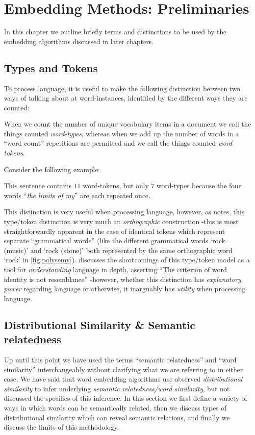 \chapter{Embedding Methods: Preliminaries}
In this chapter we outline briefly terms and distinctions to be used by the embedding algorithms discussed in later chapters.

\section{Types and Tokens}
To process language, it is useful to make the following distinction between two ways of talking about at word-instances, identified by the different ways they are counted:
\begin{definition}
  When we count the number of unique vocabulary items in a document we call the things counted \emph{word-types}, whereas when we add up the number of words in a ``word count'' repetitions are permitted and we call the things counted \emph{word tokens}.
\end{definition}
Consider the following example:
\begin{example}\par
\phantom{line}
This sentence contains $11$ word-tokens, but only $7$ word-types because the four words ``\emph{the limits of my}'' are each repeated once.
\end{example}
This distinction is very useful when processing language, however, as \textcite{kaplan-1990-words} notes, this type/token distinction is very much an \emph{orthographic} construction -this is most straightforwardly apparent in the case of identical tokens which represent separate ``grammatical words'' (like the different grammatical words `rock (music)' and `rock (stone)' both represented by the same orthographic word `rock' in \autoref{fig:polysemy}). \citeauthor{kaplan-1990-words} discusses the shortcomings of this type/token model as a tool for \emph{understanding} language in depth, asserting ``The criterion of word identity is not resemblance'' -however, whether this distinction has \emph{explanatory power} regarding language or otherwise, it inarguably has \emph{utility} when processing language.

\section{Distributional Similarity \& Semantic relatedness}\label{sec:semantic-relatedness}
Up until this point we have used the terms ``semantic relatedness'' and ``word similarity'' interchangeably without clarifying what we are referring to in either case. We have said that word embedding algorithms use observed \emph{distributional similarity} to infer underlying \emph{semantic relatedness/word similarity}, but not discussed the specifics of this inference. In this section we first define a variety of ways in which words can be semantically related, then we discuss types of distributional similarity which can reveal semantic relations, and finally we discuss the limits of this methodology.

